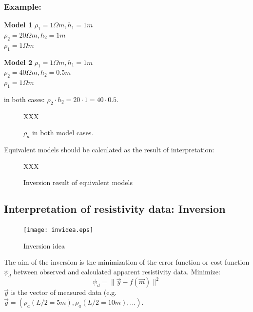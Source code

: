 \subsubsection*{Example:}
\begin{minipage}{0.45\textwidth}
\begin{center}
\textbf{Model 1}
$\rho_1=1\Omega m, h_1=1m$\\
$\rho_2=20\Omega m, h_2=1m$\\
$\rho_1=1\Omega m$\\
\end{center}
\end{minipage}
\begin{minipage}{0.45\textwidth}
\begin{center}
\textbf{Model 2}
$\rho_1=1\Omega m, h_1=1m$\\
$\rho_2=40\Omega m, h_2=0.5m$\\
$\rho_1=1\Omega m$\\
\end{center}
\end{minipage}
in both cases: $\rho_2\cdot h_2=20\cdot 1=40\cdot 0.5$.

\begin{figure}[h!]
\begin{center}
XXX
\caption{$\rho_a$ in both model cases.}
\label{fig:modelexample}
\end{center}
\end{figure}
Equivalent models should be calculated as the result of interpretation:

\begin{figure}[h!]
\begin{center}
XXX
\caption{Inversion result of equivalent models}
\label{fig:eqmodels}
\end{center}
\end{figure}

\subsection{Interpretation of resistivity data: Inversion}

\begin{figure}[h!]
\begin{center}
\texttt{[image: invidea.eps]}
\caption{Inversion idea}
\label{fig:inv01}
\end{center}
\end{figure}
The aim of the inversion is the minimization of the error function or cost function $\psi_d$ between observed and calculated apparent resistivity data. Minimize:
\begin{equation}
\psi_d=\|\vec{y}-f(\vec{m})\|^2
\end{equation}
$\vec{y}$ is the vector of measured data (e.g. $\vec{y}=(\rho_a(L/2=5m),\rho_a(L/2=10m),...)$.


